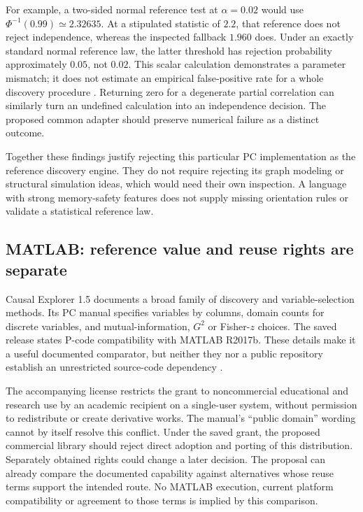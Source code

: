 For example, a two-sided normal reference test at $\alpha=0.02$ would use
$\Phi^{-1}(0.99)\simeq2.32635$. At a stipulated statistic of $2.2$, that
reference does not reject independence, whereas the inspected fallback
$1.960$ does. Under an exactly standard normal reference law, the latter
threshold has rejection probability approximately $0.05$, not $0.02$.
This scalar calculation demonstrates a parameter mismatch; it does not
estimate an empirical false-positive rate for a whole discovery procedure
\citep{exec13_other_exact}. Returning zero for a degenerate partial
correlation can similarly turn an undefined calculation into an
independence decision. The proposed common adapter should preserve numerical
failure as a distinct outcome.

Together these findings justify rejecting this particular PC implementation
as the reference discovery engine. They do not require rejecting its graph
modeling or structural simulation ideas, which would need their own
inspection. A language with strong memory-safety features does not supply
missing orientation rules or validate a statistical reference law.

\subsection{MATLAB: reference value and reuse rights are separate}

Causal Explorer 1.5 documents a broad family of discovery and variable-selection
methods. Its PC manual specifies variables by columns, domain counts for
discrete variables, and mutual-information, $G^2$ or Fisher-$z$ choices.
The saved release states P-code compatibility with MATLAB R2017b. These
details make it a useful documented comparator, but neither they nor a
public repository establish an unrestricted source-code dependency
\citep{exec13_other_explorer}.

The accompanying license restricts the grant to noncommercial educational
and research use by an academic recipient on a single-user system, without
permission to redistribute or create derivative works. The manual's
``public domain'' wording cannot by itself resolve this conflict. Under the
saved grant, the proposed commercial library should reject direct adoption
and porting of this distribution. Separately obtained rights could change a
later decision. The proposal can already compare the documented capability
against alternatives whose reuse terms support the intended route. No
MATLAB execution, current platform compatibility or agreement to those
terms is implied by this comparison.

